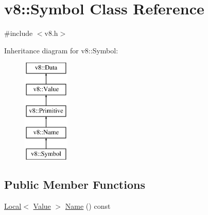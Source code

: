 \hypertarget{classv8_1_1Symbol}{}\section{v8\+:\+:Symbol Class Reference}
\label{classv8_1_1Symbol}


{\ttfamily \#include $<$v8.\+h$>$}

Inheritance diagram for v8\+:\+:Symbol\+:\begin{figure}[H]
\begin{center}
\leavevmode
\includegraphics[height=5.000000cm]{classv8_1_1Symbol}
\end{center}
\end{figure}
\subsection*{Public Member Functions}
\begin{DoxyCompactItemize}
\item 
\mbox{\hyperlink{classv8_1_1Local}{Local}}$<$ \mbox{\hyperlink{classv8_1_1Value}{Value}} $>$ \mbox{\hyperlink{classv8_1_1Symbol_a8ed6ef9221bc26fbe978bfc5e33f31b4}{Name}} () const
\end{DoxyCompactItemize}
